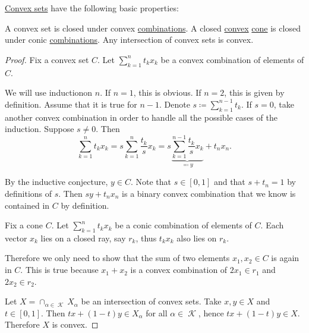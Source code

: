 \begin{proposition}\label{thm:convex_set_properties}
  \hyperref[def:convex_set]{Convex sets} have the following basic properties:

  \begin{thmenum}
     A convex set is closed under convex \hyperref[def:linear_combination/convex]{combinations}.
     A closed \hyperref[def:convex_set]{convex} \hyperref[def:geometric_cone]{cone} is closed under conic \hyperref[def:linear_combination/conic]{combinations}.
     Any intersection of convex sets is convex.
  \end{thmenum}
\end{proposition}
\begin{proof}
   Fix a convex set \( C \). Let \( \sum_{k=1}^n t_k x_k \) be a convex combination of elements of \( C \).

  We will use induction\IND on \( n \). If \( n = 1 \), this is obvious. If \( n = 2 \), this is given by definition. Assume that it is true for \( n - 1 \). Denote \( s \coloneqq \sum_{k=1}^{n-1} t_k \). If \( s = 0 \), take another convex combination in order to handle all the possible cases of the induction\IND. Suppose \( s \neq 0 \). Then
  \begin{equation*}
    \sum_{k=1}^n t_k x_k
    =
    s \sum_{k=1}^n \frac {t_k} s x_k
    =
    s \underbrace{\sum_{k=1}^{n-1} \frac {t_k} s x_k}_{\eqqcolon y} + t_n x_n.
  \end{equation*}

  By the inductive conjecture, \( y \in C \). Note that \( s \in [0, 1] \) and that \( s + t_n = 1 \) by definitions of \( s \). Then \( s y + t_n x_n \) is a binary convex combination that we know is contained in \( C \) by definition.

   Fix a cone \( C \). Let \( \sum_{k=1}^n t_k x_k \) be a conic combination of elements of \( C \). Each vector \( x_k \) lies on a closed ray, say \( r_k \), thus \( t_k x_k \) also lies on \( r_k \).

  Therefore we only need to show that the sum of two elements \( x_1, x_2 \in C \) is again in \( C \). This is true because \( x_1 + x_2 \) is a convex combination of \( 2x_1 \in r_1 \) and \( 2x_2 \in r_2 \).

   Let \( X = \cap_{\alpha \in \mscrK} X_\alpha \) be an intersection of convex sets. Take \( x, y \in X \) and \( t \in [0, 1] \). Then \( tx + (1-t)y \in X_\alpha \) for all \( \alpha \in \mscrK \), hence \( tx + (1-t)y \in X \). Therefore \( X \) is convex.
\end{proof}

